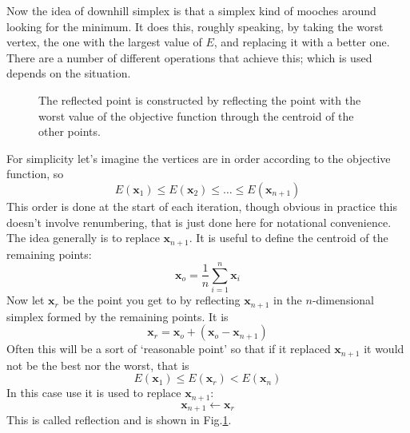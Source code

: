 \documentclass[12pt]{article}
\begin{document}
Now the idea of downhill simplex is that a simplex kind of mooches
around looking for the minimum. It does this, roughly speaking, by
taking the worst vertex, the one with the largest value of $E$, and
replacing it with a better one. There are a number of different
operations that achieve this; which is used depends on the 
situation.

\begin{figure}
\begin{center}

\end{center}
\caption{The reflected point is constructed by reflecting the point
  with the worst value of the objective function through the centroid
  of the other points.\label{fig:reflection}}
\end{figure}

For simplicity let's imagine the vertices are in order according to the
objective function, so
\begin{equation}
E(\mathbf{x}_1)\le E(\mathbf{x}_2)\le \ldots \le E(\mathbf{x}_{n+1})
\end{equation}
This order is done at the start of each iteration, though obvious in
practice this doesn't involve renumbering, that is just done here for
notational convenience. The idea generally is to replace
$\mathbf{x}_{n+1}$. It is useful to define the centroid of the
remaining points:
\begin{equation}
\mathbf{x}_o=\frac{1}{n}\sum_{i=1}^n\mathbf{x}_i
\end{equation}
Now let $\mathbf{x}_r$ be the point you get to by reflecting
$\mathbf{x}_{n+1}$ in the $n$-dimensional simplex formed by the
remaining points. It is
\begin{equation}
\mathbf{x}_r=\mathbf{x}_o+(\mathbf{x}_o-\mathbf{x}_{n+1})
\end{equation}
Often this will be a sort of \lq{}reasonable point\rq{} so that if it replaced
$\mathbf{x}_{n+1}$ it would not be the best nor the worst, that is
\begin{equation}
E(\mathbf{x}_1)\le E(\mathbf{x}_r) < E(\mathbf{x}_n)
\end{equation}
In this case use it is used to replace $\mathbf{x}_{n+1}$:
\begin{equation}
\mathbf{x}_{n+1}\leftarrow \mathbf{x}_r
\end{equation}
This is called reflection and is shown in
Fig.\ref{fig:reflection}.
\end{document}

